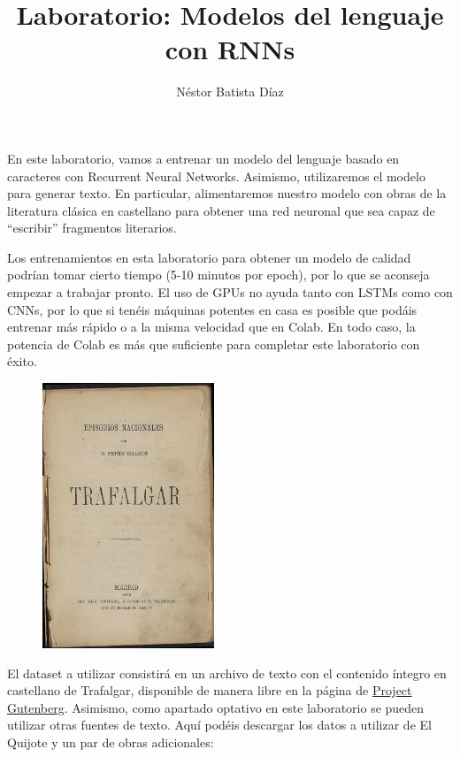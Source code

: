 \documentclass[11pt]{article}
\title{Laboratorio: Modelos del lenguaje con RNNs}
\author{Néstor Batista Díaz}
\date{}
\begin{document}
    
 \maketitle
    
    

    

En este laboratorio, vamos a entrenar un modelo del lenguaje basado en
caracteres con Recurrent Neural Networks. Asimismo, utilizaremos el
modelo para generar texto. En particular, alimentaremos nuestro modelo
con obras de la literatura clásica en castellano para obtener una red
neuronal que sea capaz de ``escribir'' fragmentos literarios.

Los entrenamientos en esta laboratorio para obtener un modelo de calidad
podrían tomar cierto tiempo (5-10 minutos por 
epoch), por lo que se
aconseja empezar a trabajar pronto. El uso de GPUs no ayuda tanto con
LSTMs como con CNNs, por lo que si tenéis máquinas potentes en casa es
posible que podáis entrenar más rápido o a la misma velocidad que en
Colab. En todo caso, la potencia de Colab es más que suficiente para
completar este laboratorio con éxito.

\begin{figure}[ht!]
    \centering
    \includegraphics[height=300px]{Portada_Trafalgar_(1873).jpg}
\end{figure}

El dataset a utilizar consistirá en un archivo de texto con el contenido
íntegro en castellano de Trafalgar, disponible de manera libre en la
página de \href{https://www.gutenberg.org}{Project Gutenberg}. Asimismo,
como apartado optativo en este laboratorio se pueden utilizar otras
fuentes de texto. Aquí podéis descargar los datos a utilizar de El
Quijote y un par de obras adicionales:
\end{document}

